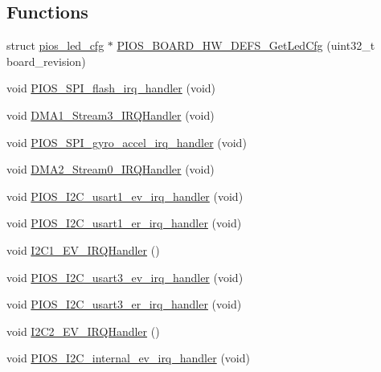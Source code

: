 \subsection*{\-Functions}
\begin{DoxyCompactItemize}
\item 
struct \hyperlink{structpios__led__cfg}{pios\-\_\-led\-\_\-cfg} $\ast$ \hyperlink{group___quanton_gafb76ae90816003eabf1d90feff7b1a52}{\-P\-I\-O\-S\-\_\-\-B\-O\-A\-R\-D\-\_\-\-H\-W\-\_\-\-D\-E\-F\-S\-\_\-\-Get\-Led\-Cfg} (uint32\-\_\-t board\-\_\-revision)
\item 
void \hyperlink{group___quanton_ga9105498d0634ecb94bb3a816f4fe28c9}{\-P\-I\-O\-S\-\_\-\-S\-P\-I\-\_\-flash\-\_\-irq\-\_\-handler} (void)
\item 
void \hyperlink{group___quanton_ga51d485393cf37043623c8bd0abae12a1}{\-D\-M\-A1\-\_\-\-Stream3\-\_\-\-I\-R\-Q\-Handler} (void)
\item 
void \hyperlink{group___quanton_gaa7e73d97eed5be2121aeced598472ba8}{\-P\-I\-O\-S\-\_\-\-S\-P\-I\-\_\-gyro\-\_\-accel\-\_\-irq\-\_\-handler} (void)
\item 
void \hyperlink{group___quanton_gaaf6ce196dde98712e1223b99766e06c0}{\-D\-M\-A2\-\_\-\-Stream0\-\_\-\-I\-R\-Q\-Handler} (void)
\item 
void \hyperlink{group___quanton_ga18612c77f3de67a42f11b9ca753ac727}{\-P\-I\-O\-S\-\_\-\-I2\-C\-\_\-usart1\-\_\-ev\-\_\-irq\-\_\-handler} (void)
\item 
void \hyperlink{group___quanton_ga5a2055663c4fc622fbdd98fe139952ab}{\-P\-I\-O\-S\-\_\-\-I2\-C\-\_\-usart1\-\_\-er\-\_\-irq\-\_\-handler} (void)
\item 
void \hyperlink{group___quanton_gad0e17b57fe51ed2861178f06899345c0}{\-I2\-C1\-\_\-\-E\-V\-\_\-\-I\-R\-Q\-Handler} ()
\item 
void \hyperlink{group___quanton_ga0255a1458b5d0d1d0378bd5a087af984}{\-P\-I\-O\-S\-\_\-\-I2\-C\-\_\-usart3\-\_\-ev\-\_\-irq\-\_\-handler} (void)
\item 
void \hyperlink{group___quanton_ga3e9a5de01828127254736c1128ed8962}{\-P\-I\-O\-S\-\_\-\-I2\-C\-\_\-usart3\-\_\-er\-\_\-irq\-\_\-handler} (void)
\item 
void \hyperlink{group___quanton_gaa32a80208798d6132876a58823ff6202}{\-I2\-C2\-\_\-\-E\-V\-\_\-\-I\-R\-Q\-Handler} ()
\item 
void \hyperlink{group___quanton_gad333f8aeebdfbaca768540198dbc3520}{\-P\-I\-O\-S\-\_\-\-I2\-C\-\_\-internal\-\_\-ev\-\_\-irq\-\_\-handler} (void)
\item 

\end{DoxyCompactItemize}
